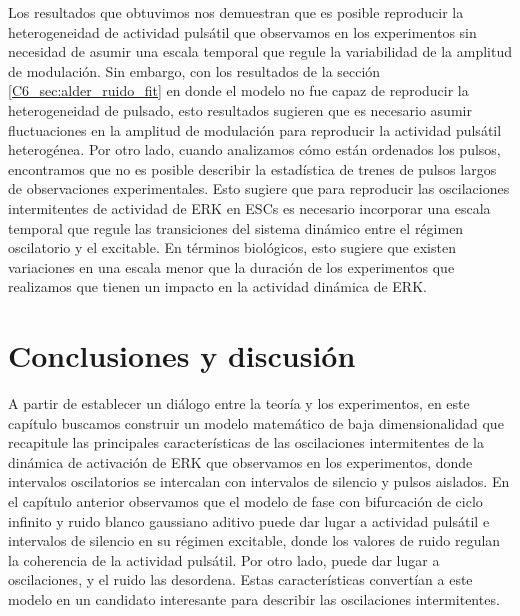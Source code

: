 \documentclass[./main.tex]{subfiles}
\begin{document}
Los resultados que obtuvimos nos demuestran que es posible reproducir la heterogeneidad de actividad pulsátil que observamos en los experimentos sin necesidad de asumir una escala temporal que regule la variabilidad de la amplitud de modulación. Sin embargo, con los resultados de la sección \ref{C6_sec:alder_ruido_fit} en donde el modelo no fue capaz de reproducir la heterogeneidad de pulsado, esto resultados sugieren que es necesario asumir fluctuaciones en la amplitud de modulación para reproducir la actividad pulsátil heterogénea. Por otro lado, cuando analizamos cómo están ordenados los pulsos, encontramos que no es posible describir la estadística de trenes de pulsos largos de observaciones experimentales. Esto sugiere que para reproducir las oscilaciones intermitentes de actividad de ERK en ESCs es necesario incorporar una escala temporal que regule las transiciones del sistema dinámico entre el régimen oscilatorio y el excitable. En términos biológicos, esto sugiere que existen variaciones en una escala menor que la duración de los experimentos que realizamos que tienen un impacto en la actividad dinámica de ERK. 


\section{Conclusiones y discusión}

A partir de establecer un diálogo entre la teoría y los experimentos, en este capítulo buscamos construir un modelo matemático de baja dimensionalidad que recapitule las principales características de las oscilaciones intermitentes de la dinámica de activación de ERK que observamos en los experimentos, donde intervalos oscilatorios se intercalan con intervalos de silencio y pulsos aislados. En el capítulo anterior observamos que el modelo de fase con bifurcación de ciclo infinito y ruido blanco gaussiano aditivo puede dar lugar a actividad pulsátil e intervalos de silencio en su régimen excitable, donde los valores de ruido regulan la coherencia de la actividad pulsátil. Por otro lado, puede dar lugar a oscilaciones, y el ruido las desordena. Estas características convertían a este modelo en un candidato interesante para describir las oscilaciones intermitentes.
\end{document}
